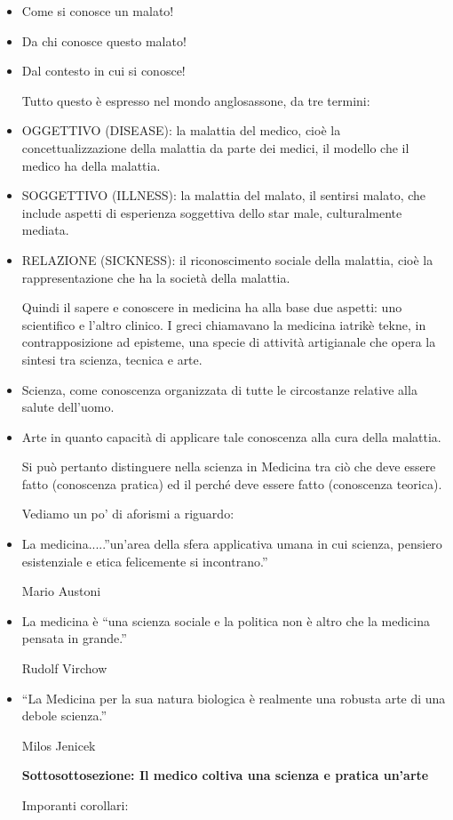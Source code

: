 \documentclass[]{article}
\begin{document}
\begin{itemize}
\item
  Come si conosce un malato!
\item
  Da chi conosce questo malato!
\item
  Dal contesto in cui si conosce!

  Tutto questo è espresso nel mondo anglosassone, da tre termini:
\item
  OGGETTIVO (DISEASE): la malattia del medico, cioè la
  concettualizzazione della malattia da parte dei medici, il modello che
  il medico ha della malattia.
\item
  SOGGETTIVO (ILLNESS): la malattia del malato, il sentirsi malato, che
  include aspetti di esperienza soggettiva dello star male,
  culturalmente mediata.
\item
  RELAZIONE (SICKNESS): il riconoscimento sociale della malattia, cioè
  la rappresentazione che ha la società della malattia.

  Quindi il sapere e conoscere in medicina ha alla base due aspetti: uno
  scientifico e l'altro clinico. I greci chiamavano la medicina iatrikè
  tekne, in contrapposizione ad episteme, una specie di attività
  artigianale che opera la sintesi tra scienza, tecnica e arte.
\item
  Scienza, come conoscenza organizzata di tutte le circostanze relative
  alla salute dell'uomo.
\item
  Arte in quanto capacità di applicare tale conoscenza alla cura della
  malattia.

  Si può pertanto distinguere nella scienza in Medicina tra ciò che deve
  essere fatto (conoscenza pratica) ed il perché deve essere fatto
  (conoscenza teorica).

  Vediamo un po' di aforismi a riguardo:
\item
  La medicina.....''un'area della sfera applicativa umana in cui
  scienza, pensiero esistenziale e etica felicemente si incontrano.''

  Mario Austoni
\item
  La medicina è ``una scienza sociale e la politica non è altro che la
  medicina pensata in grande.''

  Rudolf Virchow
\item
  ``La Medicina per la sua natura biologica è realmente una robusta arte
  di una debole scienza.''

  Milos Jenicek

  \textbf{Sottosottosezione: Il medico coltiva una scienza e pratica
  un'arte}

  Imporanti corollari:
\end{itemize}
\end{document}
